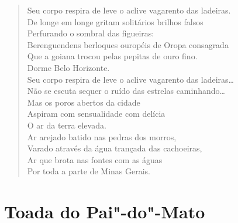 \begin{verse}
Seu corpo respira de leve o aclive vagarento das ladeiras.\\
De longe em longe gritam solitários brilhos falsos\\
Perfurando o sombral das figueiras:\\
Berenguendens berloques ouropéis de Oropa consagrada\\
Que a goiana trocou pelas pepitas de ouro fino.\\
Dorme Belo Horizonte.\\
Seu corpo respira de leve o aclive vagarento das ladeiras\ldots{}\\
Não se escuta sequer o ruído das estrelas caminhando\ldots{}\\
Mas os poros abertos da cidade\\
Aspiram com sensualidade com delícia\\
O ar da terra elevada.\\
Ar arejado batido nas pedras dos morros,\\
Varado através da água trançada das cachoeiras,\\
Ar que brota nas fontes com as águas\\
Por toda a parte de Minas Gerais.
\end{verse}


\chapter[Toada do Pai"-do"-Mato]{Toada do Pai"-do"-Mato }




